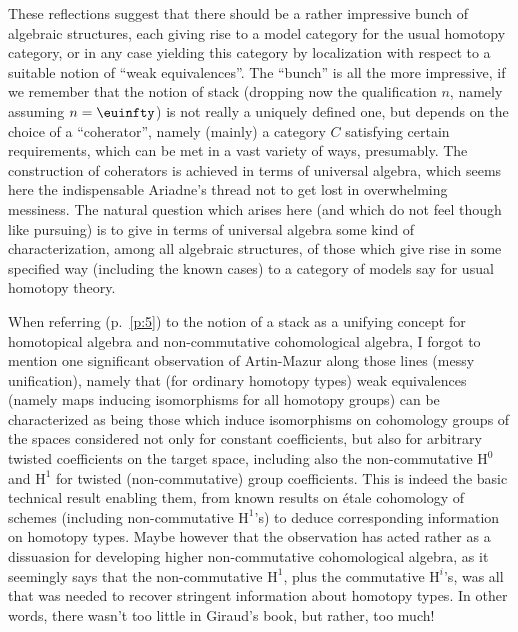 These reflections suggest that there should be a rather
impressive bunch of algebraic structures, each giving rise to a model
category for the usual homotopy category, or in any case yielding this
category by localization with respect to a suitable notion of ``weak
equivalences''. The ``bunch'' is all the more impressive, if we
remember that the notion of stack (dropping now the qualification $n$,
namely assuming $n=\oo$) is not really a uniquely defined one, but
depends on the choice of a ``coherator'', namely (mainly) a category
$C$ satisfying certain requirements, which can be met in a vast
variety of ways, presumably. The construction of coherators is
achieved in terms of universal algebra, which seems here the
indispensable Ariadne's thread not to get lost in overwhelming
messiness. The natural question which arises here (and which do not
feel though like pursuing) is to give in terms of universal algebra
some kind of characterization, among all algebraic structures, of
those which give rise in some specified way (including the known
cases) to a category of models say for usual homotopy theory.

\renewcommand{\thesection}{\arabic{section}} \label{sec:17}%
When referring (p.\ \ref{p:5}) to the notion of a stack as a unifying
concept for homotopical algebra and non-commutative cohomological
algebra, I forgot to mention one significant observation of
Artin-Mazur along those lines (messy unification), namely that (for
ordinary homotopy types) weak equivalences (namely maps inducing
isomorphisms for all homotopy groups) can be characterized as being
those which induce isomorphisms on cohomology groups of the spaces
considered not only for constant coefficients, but also for arbitrary
twisted coefficients on the target space, including also the
non-commutative $\mathrm H^0$ and $\mathrm H^1$ for twisted
(non-commutative) group coefficients. This is indeed the basic
technical result enabling them, from known results on \'etale
cohomology of schemes (including non-commutative $\mathrm H^1$'s) to
deduce corresponding information on homotopy types. Maybe however that
the observation has acted rather as a dissuasion for developing higher
non-commutative cohomological algebra, as it seemingly says that the
non-commutative $\mathrm H^1$, plus the commutative $\mathrm H^i$'s,
was all that was needed to recover stringent information about
homotopy types. In other words, there wasn't too little in Giraud's
book, but rather, too much!

